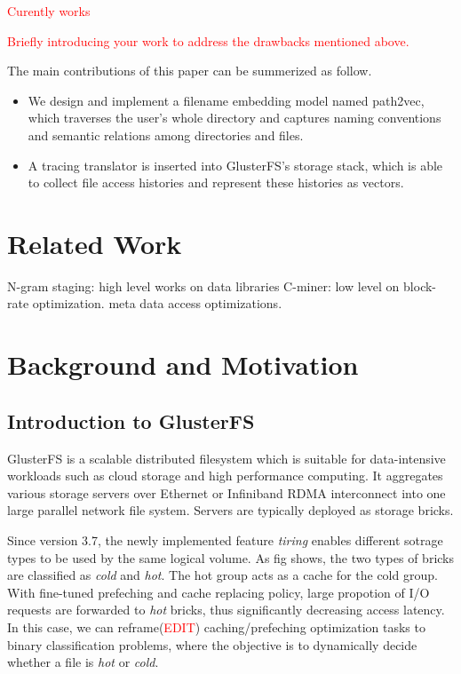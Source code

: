 \documentclass[conference]{IEEEtran}
\begin{document}
\textcolor{red}{Curently works}




\textcolor{red}{Briefly introducing your work to address the drawbacks mentioned above.}

The main contributions of this paper can be summerized as follow.
\begin{itemize}
    \item We design and implement a filename embedding model named path2vec, 
    which traverses the user's whole directory and captures naming conventions and semantic relations among directories and files.
    \item A tracing translator is inserted into GlusterFS's storage stack, which is able to collect file access histories and represent these histories as vectors.

\end{itemize}

\section{Related Work}
N-gram staging: high level works on data libraries
C-miner: low level on block-rate optimization.
meta data access optimizations.

\section{Background and Motivation}
\subsection{Introduction to GlusterFS}
GlusterFS is a scalable distributed filesystem which is suitable for data-intensive workloads such as cloud storage and high performance computing.
It aggregates various storage servers over Ethernet or Infiniband RDMA interconnect into one large parallel network file system.
Servers are typically deployed as storage bricks.


Since version 3.7, the newly implemented feature \textit{tiring} enables different sotrage types to be used by the same logical volume.
As fig shows, the two types of bricks are classified as \textit{cold} and \textit{hot}. The hot group acts as a cache for the cold group. 
With fine-tuned prefeching and cache replacing policy, large propotion of I/O requests are forwarded to \textit{hot} bricks, thus significantly decreasing access latency.
In this case, we can reframe(\textcolor{red}{EDIT}) caching/prefeching optimization tasks to binary classification problems,
where the objective is to dynamically decide whether a file is \textit{hot} or \textit{cold}.
\end{document}
